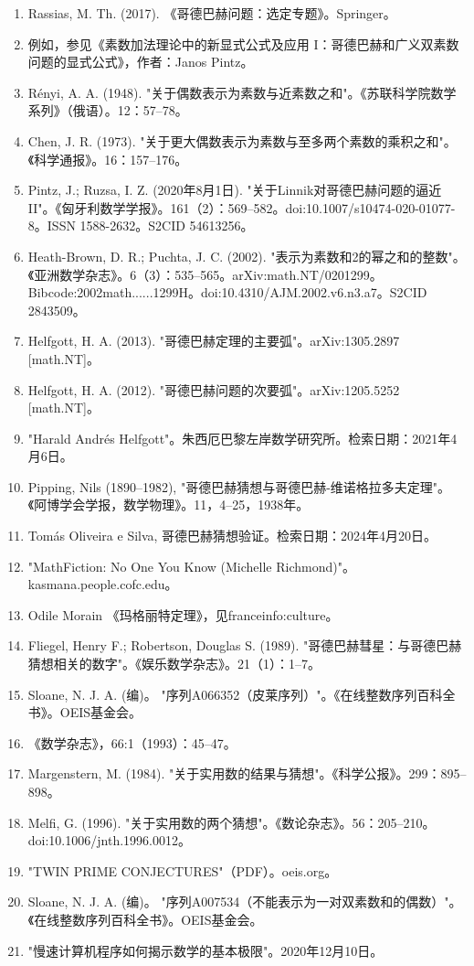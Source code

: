\begin{enumerate}
\item Rassias, M. Th. (2017). 《哥德巴赫问题：选定专题》。Springer。  
\item 例如，参见《素数加法理论中的新显式公式及应用 I：哥德巴赫和广义双素数问题的显式公式》，作者：Janos Pintz。
\item Rényi, A. A. (1948). "关于偶数表示为素数与近素数之和"。《苏联科学院数学系列》（俄语）。12：57–78。  
\item Chen, J. R. (1973). "关于更大偶数表示为素数与至多两个素数的乘积之和"。《科学通报》。16：157–176。  
\item Pintz, J.; Ruzsa, I. Z. (2020年8月1日). "关于Linnik对哥德巴赫问题的逼近 II"。《匈牙利数学学报》。161（2）：569–582。doi:10.1007/s10474-020-01077-8。ISSN 1588-2632。S2CID 54613256。  
\item Heath-Brown, D. R.; Puchta, J. C. (2002). "表示为素数和2的幂之和的整数"。《亚洲数学杂志》。6（3）：535–565。arXiv:math.NT/0201299。Bibcode:2002math......1299H。doi:10.4310/AJM.2002.v6.n3.a7。S2CID 2843509。  
\item Helfgott, H. A. (2013). "哥德巴赫定理的主要弧"。arXiv:1305.2897 [math.NT]。  
\item Helfgott, H. A. (2012). "哥德巴赫问题的次要弧"。arXiv:1205.5252 [math.NT]。
\item "Harald Andrés Helfgott"。朱西厄巴黎左岸数学研究所。检索日期：2021年4月6日。  
\item Pipping, Nils (1890–1982), "哥德巴赫猜想与哥德巴赫-维诺格拉多夫定理"。《阿博学会学报，数学物理》。11，4–25，1938年。  
\item Tomás Oliveira e Silva, 哥德巴赫猜想验证。检索日期：2024年4月20日。  
\item "MathFiction: No One You Know (Michelle Richmond)"。kasmana.people.cofc.edu。  
\item Odile Morain 《玛格丽特定理》，见franceinfo:culture。  
\item Fliegel, Henry F.; Robertson, Douglas S. (1989). "哥德巴赫彗星：与哥德巴赫猜想相关的数字"。《娱乐数学杂志》。21（1）：1–7。  
\item Sloane, N. J. A. (编)。 "序列A066352（皮莱序列）"。《在线整数序列百科全书》。OEIS基金会。  
\item 《数学杂志》，66:1（1993）：45–47。  
\item Margenstern, M. (1984). "关于实用数的结果与猜想"。《科学公报》。299：895–898。  
\item Melfi, G. (1996). "关于实用数的两个猜想"。《数论杂志》。56：205–210。doi:10.1006/jnth.1996.0012。  
\item "TWIN PRIME CONJECTURES"（PDF）。oeis.org。  
\item Sloane, N. J. A. (编)。 "序列A007534（不能表示为一对双素数和的偶数）"。《在线整数序列百科全书》。OEIS基金会。  
\item "慢速计算机程序如何揭示数学的基本极限"。2020年12月10日。
\end{enumerate}
